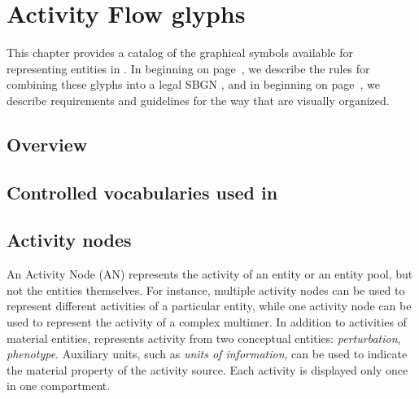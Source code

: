 \chapter{Activity Flow glyphs}


This chapter provides a catalog of the graphical symbols available for representing entities in \AFs. In  beginning on page~\pageref{chp:af:grammar}, we describe the rules for combining these glyphs into a legal SBGN \AFm, and in  beginning on page~\pageref{chp:af:layout}, we describe requirements and guidelines for the way that \AFms are visually organized.

\section{Overview}



\section{Controlled vocabularies used in \SBGNAFLone}\label{af:sec:CVs}




\section{Activity nodes}\label{sec:af:ANs}

An Activity Node (AN) represents the activity of an entity or an entity pool, but not the entities themselves. For instance, multiple activity nodes can be used to represent different activities of a particular entity, while one activity node can be used to represent the activity of a complex multimer. In addition to activities of material entities, \SBGNAFLone represents activity from two conceptual entities: \emph{perturbation}, \emph{phenotype}.  Auxiliary units, such as \emph{units of information}, can be used to indicate the material property of the activity source.  Each activity is displayed only once in one compartment.


